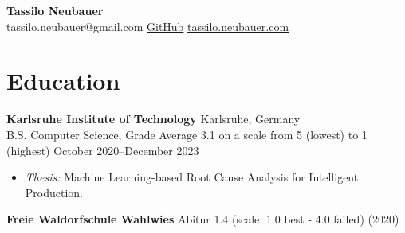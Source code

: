 \documentclass[letterpaper, 9pt]{article}
\newcommand{\header}[4]{
    \begin{center}
        \textbf{\Huge{#1}}\\
        \small{
            \textcolor{accent}{#2} \hspace{1em}
            \href{#3}{GitHub}\hspace{1em}
            \href{#4}{tassilo.neubauer.com}
        }
    \end{center}
}
\begin{document}
\header{Tassilo Neubauer}{tassilo.neubauer@gmail.com}{https://github.com/sonofhypnos}{https://www.tassiloneubauer.com/}

\section*{Education}
\textbf{Karlsruhe Institute of Technology} \hfill Karlsruhe, Germany \\
B.S. Computer Science, Grade Average 3.1 on a scale from 5 (lowest) to 1 (highest) \hfill October 2020--December 2023
\begin{itemize}
    \item \textit{Thesis:} Machine Learning-based Root Cause Analysis for Intelligent Production.
\end{itemize}
\textbf{Freie Waldorfschule Wahlwies} \hfill Abitur 1.4 (scale: 1.0 best - 4.0 failed) (2020)
\end{document}
